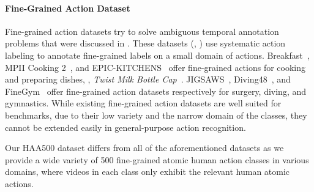 \documentclass[10pt,twocolumn,letterpaper]{article}
\begin{document}
\vspace{-1em}
\paragraph{Fine-Grained Action Dataset} 
Fine-grained action datasets try to solve ambiguous temporal annotation problems that were discussed in \cite{alwassel2018diagnosing,moltisanti2017trespassing}.
These datasets (\eg, \cite{epickitchens,jigsaws,breakfast,diving48,MPIICooking2,finegym}) use systematic action labeling to annotate fine-grained labels on a small domain of actions. Breakfast~\cite{breakfast}, MPII Cooking 2~\cite{MPIICooking2}, and EPIC-KITCHENS~\cite{epickitchens} offer fine-grained actions for cooking and preparing dishes, \eg, \textit{Twist Milk Bottle Cap}~\cite{breakfast}.
JIGSAWS~\cite{jigsaws}, Diving48~\cite{diving48}, and FineGym~\cite{finegym}  offer fine-grained action datasets respectively for surgery, diving, and gymnastics. While existing fine-grained action datasets are well suited for benchmarks, due to their low variety and the narrow domain of the classes, they cannot be extended easily in  general-purpose action recognition.

\vspace{0.1in}
Our HAA500 dataset differs from all of the aforementioned datasets as we provide a wide variety of 500 fine-grained atomic human action classes in various domains, where videos in each class only exhibit the relevant human atomic actions. 

\vspace{-0.3em}
\end{document}
